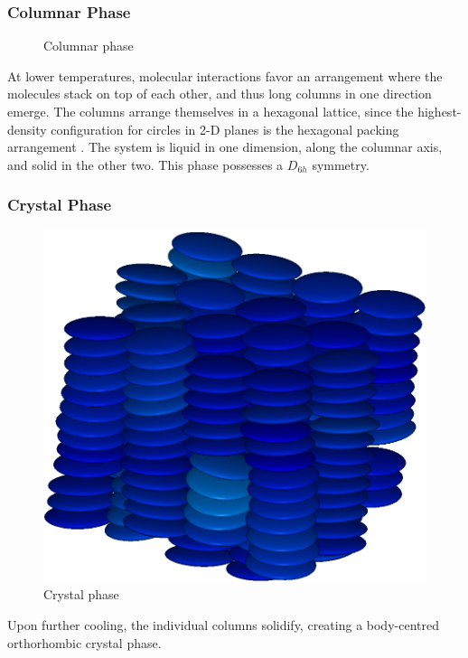 \subsubsection{Columnar Phase}
\begin{figure}[H]
 \centering
 \caption{Columnar phase}
\end{figure}

At lower temperatures, molecular interactions favor an arrangement where the molecules stack on top of each other, and thus long columns in one direction emerge. The columns arrange themselves in a hexagonal lattice, since the highest-density configuration for circles in 2-D planes is the hexagonal packing arrangement \cite{chang2010simple}. 
The system is liquid in one dimension, along the columnar axis, and solid in the other two.
This phase possesses a $D_{6 h}$ symmetry.
\subsubsection{Crystal Phase}
\begin{figure}[H]
 \centering
 \includegraphics[width=.3\linewidth]{images/crystal.png}
 \caption{Crystal phase}
 \label{fig:Crystal phase}
\end{figure}
Upon further cooling, the individual columns solidify, creating a body-centred orthorhombic crystal phase.

